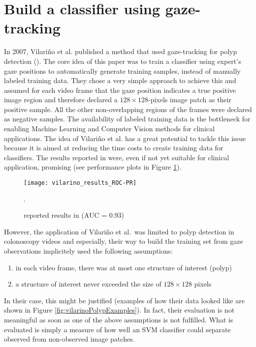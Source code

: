 \section{Build a classifier using gaze-tracking}
In 2007, Vilari\~no et al. published a method that used gaze-tracking for polyp detection (\cite{vilarino2007automatic}). 
The core idea of this paper was to train a classifier using expert's gaze positions to automatically generate training samples, instead of manually labeled training data. 
They chose a very simple approach to achieve this and assumed for each video frame that the gaze position indicates a true positive image region and therefore declared a $128\times128$-pixels image patch as their positive sample. All the other non-overlapping regions of the frames were declared as negative samples.
The availability of labeled training data is the bottleneck for enabling Machine Learning and Computer Vision methods for clinical applications. 
The idea of Vilari\~no et al. has a great potential to tackle this issue because it is aimed at reducing the time costs to create training data for classifiers. 
The results reported in \cite{vilarino2007automatic} were, even if not yet suitable for clinical application, promising (see performance plots in Figure \ref{fig:vilarino-results}).
\begin{figure}[ht]
	\centering
	\texttt{[image: vilarino\_results\_ROC-PR]}
	\caption{reported results in \cite{vilarino2007automatic} (AUC = 0.93)}.
	\label{fig:vilarino-results}
\end{figure}

However, the application of Vilari\~no et al.\ was limited to polyp detection in colonoscopy videos and especially, their way to build the training set from gaze observations implicitely used the following assumptions:
\begin{enumerate}
 \item in each video frame, there was at most one structure of interest (polyp)
 \item a structure of interest never exceeded the size of $128 \times 128$ pixels
\end{enumerate}
In their case, this might be justified (examples of how their data looked like are shown in Figure \ref{fig:vilarinoPolypExamples}). 
In fact, their evaluation is not meaningful as soon as one of the above assumptions is not fulfilled. What is evaluated is simply a measure of how well an SVM classifier could separate observed from non-observed image patches. 

